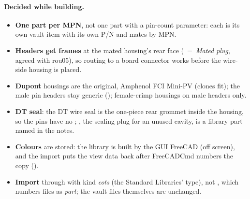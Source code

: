 \paragraph{Decided while building.}
\begin{itemize}[nosep]
  \item \textbf{One part per MPN}, not one part with a pin-count parameter: each is its own vault item with its own
        P/N and mates by MPN.
  \item \textbf{Headers get frames} at the mated housing's rear face (~=~\emph{Mated plug}, agreed with
        rou05), so routing to a board connector works before the wire-side housing is placed.
  \item \textbf{Dupont} housings are the original, Amphenol FCI Mini-PV (clones fit); the male pin headers stay
        generic (); female-crimp housings on male headers only.
  \item \textbf{DT seal}: the DT wire seal is the one-piece rear grommet inside the housing, so the pins have no
        ; , the sealing plug for an unused cavity, is a library part named in the notes.
  \item \textbf{Colours} are stored: the library is built by the GUI FreeCAD (off screen), and the import puts the
        view data back after FreeCADCmd numbers the copy ().
  \item \textbf{Import} through  with kind \emph{cots} (the Standard Libraries' type),
        not , which numbers files as \emph{part}; the vault files themselves are unchanged.
\end{itemize}

